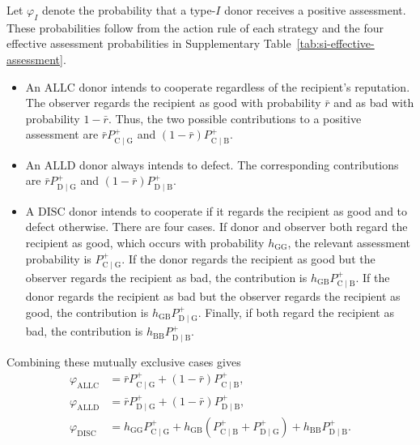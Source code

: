 \documentclass[fleqn,10pt]{wlscirep}
\begin{document}
Let $\varphi_I$ denote the probability that a type-$I$ donor receives a positive assessment. These probabilities follow from the action rule of each strategy and the four effective assessment probabilities in Supplementary Table~\ref{tab:si-effective-assessment}.
\begin{itemize}
\item An $\mathrm{ALLC}$ donor intends to cooperate regardless of the recipient's reputation. The observer regards the recipient as good with probability $\bar r$ and as bad with probability $1-\bar r$. Thus, the two possible contributions to a positive assessment are $\bar rP^+_{\mathrm{C}\mid\mathrm{G}}$ and $(1-\bar r)P^+_{\mathrm{C}\mid\mathrm{B}}$.

\item An $\mathrm{ALLD}$ donor always intends to defect. The corresponding contributions are $\bar rP^+_{\mathrm{D}\mid\mathrm{G}}$ and $(1-\bar r)P^+_{\mathrm{D}\mid\mathrm{B}}$.

\item A $\mathrm{DISC}$ donor intends to cooperate if it regards the recipient as good and to defect otherwise. There are four cases. If donor and observer both regard the recipient as good, which occurs with probability $h_{\mathrm{GG}}$, the relevant assessment probability is $P^+_{\mathrm{C}\mid\mathrm{G}}$. If the donor regards the recipient as good but the observer regards the recipient as bad, the contribution is $h_{\mathrm{GB}}P^+_{\mathrm{C}\mid\mathrm{B}}$. If the donor regards the recipient as bad but the observer regards the recipient as good, the contribution is $h_{\mathrm{GB}}P^+_{\mathrm{D}\mid\mathrm{G}}$. Finally, if both regard the recipient as bad, the contribution is $h_{\mathrm{BB}}P^+_{\mathrm{D}\mid\mathrm{B}}$.
\end{itemize}

Combining these mutually exclusive cases gives
\begin{equation}
\begin{aligned}
\varphi_{\mathrm{ALLC}}
&=\bar rP^+_{\mathrm{C}\mid\mathrm{G}}
+(1-\bar r)P^+_{\mathrm{C}\mid\mathrm{B}},\\
\varphi_{\mathrm{ALLD}}
&=\bar rP^+_{\mathrm{D}\mid\mathrm{G}}
+(1-\bar r)P^+_{\mathrm{D}\mid\mathrm{B}},\\
\varphi_{\mathrm{DISC}}
&=h_{\mathrm{GG}}P^+_{\mathrm{C}\mid\mathrm{G}}
+h_{\mathrm{GB}}\left(P^+_{\mathrm{C}\mid\mathrm{B}}
+P^+_{\mathrm{D}\mid\mathrm{G}}\right)
+h_{\mathrm{BB}}P^+_{\mathrm{D}\mid\mathrm{B}}.
\end{aligned}
\label{eq:si-positive-assessment-probabilities}
\end{equation}
\end{document}
